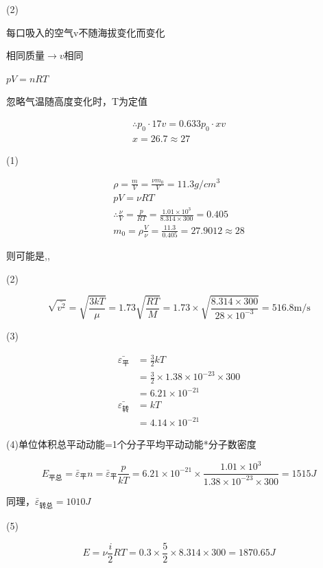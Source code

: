 \documentclass[b5paper,opensource]{./template/qyxf-book}
\begin{document}
(2)

每口吸入的空气v不随海拔变化而变化

相同质量$\rightarrow v $相同

$pV=nRT$

忽略气温随高度变化时，T为定值

$$
\begin{array} { l } { \therefore p _ { 0 } \cdot 17 v = 0.633 p _ { 0 } \cdot x v } \\ { x = 26.7 \approx 27 } \end{array}
$$


\solve

(1)

$$
\begin{array} { c } { \rho = \frac { m } { V } = \frac { \nu m _ { 0 } } { V } = 11.3 g / c m ^ { 3 } } \\ { p V = \nu R T } \\ { \therefore \frac { \nu } { V } = \frac { p } { R T } = \frac { 1.01 \times 10 ^ { 3 } } { 8.314 \times 300 } = 0.405 } \\ { m _ { 0 } = \rho \frac { V } { \nu } = \frac { 11.3 } { 0.405 } = 27.9012 \approx 28 } \end{array}
$$

则可能是,,

(2)

$$
\sqrt{\bar{v^{2}}}=\sqrt {\frac{3kT}{\mu}}=1.73\sqrt {\frac{RT}{M}}=1.73\times\sqrt{\frac{8.314\times 300}{28\times10^{-3}}}=516.8\mathrm{m}/\mathrm{s}
$$

(3)

\begin{align*}
\bar{\varepsilon_{\mbox{平}}}&=\frac{3}{2}kT\\
&=\frac{3}{2}\times 1.38\times 10^{-23}\times 300\\
&=6.21\times 10^{-21}\\
\bar{\varepsilon_{\mbox{转}}}&=kT\\
&=4.14\times 10^{-21}
\end{align*}

(4)单位体积总平动动能=1个分子平均平动动能*分子数密度

$$E_{\mbox{平总}}=\bar { \varepsilon } _ {\mbox{平}}n=\bar { \varepsilon } _ {\mbox{平}}\frac{p}{kT}=6.21 \times 10 ^ { - 21 } \times \frac { 1.01 \times 10 ^ { 3 } } { 1.38 \times 10 ^ { - 23 } \times 300 } = 1515 J$$

同理，$\bar { \varepsilon } _ {\mbox{转总}}=1010J$

(5)

$$
E = \nu \frac { i } { 2 } R T = 0.3 \times \frac { 5 } { 2 } \times 8.314 \times 300 = 1870.65 J
$$
\end{document}
